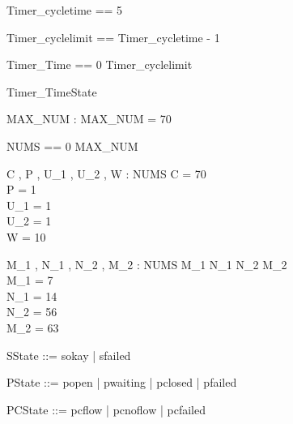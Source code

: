 \documentclass{article}
\begin{document}

\begin{zed}
	Timer\_cycletime == 5
\end{zed}

\begin{zed}
	Timer\_cyclelimit == Timer\_cycletime - 1
\end{zed}

\begin{zed}
	Timer\_Time == 0 \upto Timer\_cyclelimit
\end{zed}

\begin{zed}
	Timer\_TimeState 
\end{zed}

\begin{axdef}
	MAX\_NUM : \nat 
\where
 MAX\_NUM = 70
\end{axdef}

\begin{zed}
	NUMS == 0 \upto MAX\_NUM
\end{zed}

\begin{axdef}
	C , P , U\_1 , U\_2 , W : NUMS 
\where
 C = 70 \\
 P = 1 \\
 U\_1 = 1 \\
 U\_2 = 1 \\
 W = 10
\end{axdef}

\begin{axdef}
	M\_1 , N\_1 , N\_2 , M\_2 : NUMS 
\where
 M\_1 \leq N\_1 \leq N\_2 \leq M\_2 \\
 M\_1 = 7 \\
 N\_1 = 14 \\
 N\_2 = 56 \\
 M\_2 = 63
\end{axdef}

\begin{zed}
	SState ::= sokay | sfailed
\end{zed}

\begin{zed}
	PState ::= popen | pwaiting | pclosed | pfailed
\end{zed}

\begin{zed}
	PCState ::= pcflow | pcnoflow | pcfailed
\end{zed}
\end{document}
